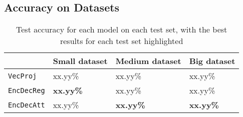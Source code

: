 \subsection{Accuracy on Datasets}

\begin{table}[H]
    \centering
    \begin{tabular}{|l|l|l|l|}
        \hline 
                                        & \textbf{Small dataset}          & \textbf{Medium dataset}         & \textbf{Big dataset}            \\ \hline
        {\tt VecProj}                   & xx.yy\%                         & xx.yy\%                         & xx.yy\%                         \\ \hline
        {\tt EncDecReg}                 & \textbf{xx.yy\%}                & xx.yy\%                         & xx.yy\%                         \\ \hline
        {\tt EncDecAtt}                 & xx.yy\%                         & \textbf{xx.yy\%}                & \textbf{xx.yy\%}                \\ \hline
    \end{tabular}
    \caption{Test accuracy for each model on each test set, with the best results for each test set highlighted}
    \label{table:accuracy_model_data_sets}
\end{table}